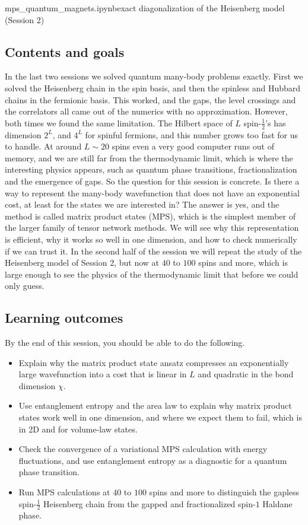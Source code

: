 \documentclass[lecture_notes.tex]{subfiles}
\begin{document}
%
  {mps\_quantum\_magnets.ipynb}{exact diagonalization of the Heisenberg model (Session 2)}

\subsection*{Contents and goals}
In the last two sessions we solved quantum many-body problems exactly. First we solved the
Heisenberg chain in the spin basis, and then the spinless and Hubbard chains in the fermionic
basis. This worked, and the gaps, the level crossings and the correlators all came out of the
numerics with no approximation. However, both times we found the same limitation. The Hilbert
space of $L$ spin-$\tfrac12$'s has dimension $2^L$, and $4^L$ for spinful fermions, and this number
grows too fast for us to handle. At around $L\sim 20$ spins even a very good computer runs out of
memory, and we are still far from the thermodynamic limit, which is where the interesting physics
appears, such as quantum phase transitions, fractionalization and the emergence of gaps. So the
question for this session is concrete. Is there a way to represent the many-body wavefunction that
does not have an exponential cost, at least for the states we are interested in? The answer is yes,
and the method is called matrix product states (MPS), which is the simplest member of the larger
family of tensor network methods. We will see why this representation is efficient, why it works
so well in one dimension, and how to check numerically if we can trust it. In the second half of
the session we will repeat the study of the Heisenberg model of Session 2, but now at $40$ to $100$
spins and more, which is large enough to see the physics of the thermodynamic limit that before we
could only guess.

\subsection*{Learning outcomes}
By the end of this session, you should be able to do the following.
\begin{itemize}[nosep]
  \item Explain why the matrix product state ansatz compresses an exponentially large
    wavefunction into a cost that is linear in $L$ and quadratic in the bond dimension $\chi$.
  \item Use entanglement entropy and the area law to explain why matrix product states work well
    in one dimension, and where we expect them to fail, which is in 2D and for volume-law states.
  \item Check the convergence of a variational MPS calculation with energy fluctuations, and use
    entanglement entropy as a diagnostic for a quantum phase transition.
  \item Run MPS calculations at $40$ to $100$ spins and more to distinguish the gapless spin-$\tfrac12$
    Heisenberg chain from the gapped and fractionalized spin-$1$ Haldane phase.
\end{itemize}
\end{document}
